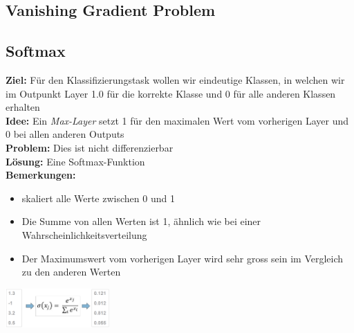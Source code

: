 \documentclass{article}
\newenvironment{Figure}
	{\par\medskip\noindent\minipage{\linewidth}}
	{\endminipage\par\medskip}
\theoremstyle{merke}
\theoremstyle{definition}
\begin{document}
        \subsection{Vanishing Gradient Problem}

        \subsection{Softmax}
        \textbf{Ziel:} Für den Klassifizierungstask wollen wir eindeutige Klassen, in welchen wir im Outpunkt Layer 1.0 für die korrekte Klasse und 0 für alle anderen Klassen erhalten\\
        \textbf{Idee:} Ein \textit{Max-Layer} setzt 1 für den maximalen Wert vom vorherigen Layer und 0 bei allen anderen Outputs\\
        \textbf{Problem:} Dies ist nicht differenzierbar\\
        \textbf{Lösung:} Eine Softmax-Funktion\\
        \textbf{Bemerkungen:}
        \begin{itemize}
            \item skaliert alle Werte zwischen 0 und 1
            \item Die Summe von allen Werten ist 1, ähnlich wie bei einer Wahrscheinlichkeitsverteilung
            \item Der Maximumswert vom vorherigen Layer wird sehr gross sein im Vergleich zu den anderen Werten
        \end{itemize}
        \begin{Figure}
        \centering
        \includegraphics[width=150px]{img/Softmax.png}
            \label{fig:Vor und nach dem Dropout}
        \end{Figure}
\end{document}
